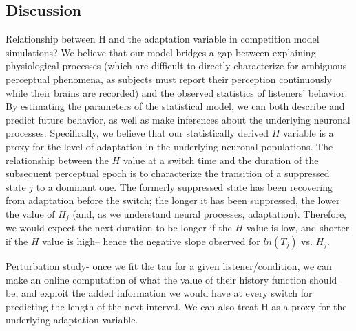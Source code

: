 \subsection{Discussion}

Relationship between H and the adaptation variable in competition model simulations? We believe that our model bridges a gap between explaining physiological processes (which are difficult to directly characterize for ambiguous perceptual phenomena, as subjects must report their perception continuously while their brains are recorded) and the observed statistics of listeners' behavior. By estimating the parameters of the statistical model, we can both describe and predict future behavior, as well as make inferences about the underlying neuronal processes. Specifically, we believe that our statistically derived $H$ variable is a proxy for the level of adaptation in the underlying neuronal populations. The relationship between the $H$ value at a switch time and the duration of the subsequent perceptual epoch is to characterize the transition of a suppressed state $j$ to a dominant one. The formerly suppressed state has been recovering from adaptation before the switch; the longer it has been suppressed, the lower the value of $H_j$ (and, as we understand neural processes, adaptation). Therefore, we would expect the next duration to be longer if the $H$ value is low, and shorter if the $H$ value is high-- hence the negative slope observed for $ln(T_j)$ vs. $H_j$.


Perturbation study- once we fit the tau for a given listener/condition, we can make an online computation of what the value of their history function should be, and exploit the added information we would have at every switch for predicting the length of the next interval. We can also treat H as a proxy for the underlying adaptation variable. 
